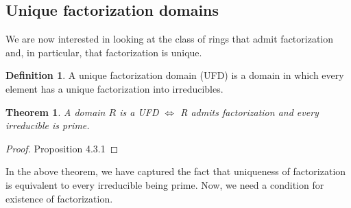 \documentclass{article}
\newtheorem{theorem}{Theorem}[section]
\theoremstyle{definition}
\newtheorem{definition}{Definition}[subsection]
\theoremstyle{remark}
\theoremstyle{plain}
\begin{document}
\subsection{Unique factorization domains}

We are now interested in looking at the class of rings that admit factorization and, in particular, that factorization is unique.

\begin{definition}
    A unique factorization domain (UFD) is a domain in which every element has a unique factorization into irreducibles.
\end{definition}

\begin{theorem}
    A domain \(R\) is a UFD \(\iff\) R admits factorization and every irreducible is prime. 
\end{theorem}

\begin{proof}
    Proposition 4.3.1
\end{proof}

In the above theorem, we have captured the fact that uniqueness of factorization is equivalent to 
every irreducible being prime. Now, we need a condition for existence of factorization.
\end{document}
